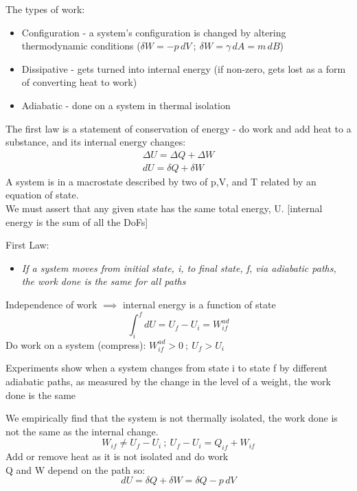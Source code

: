 \documentclass[a4paper, 11pt, normalem]{report}
\begin{document}
The types of work:
\begin{itemize}
    \item Configuration - a system's configuration is changed by altering thermodynamic conditions ($\delta W = -p\,dV ~;~ \delta W = \gamma\,dA = m\,dB$)
    \item Dissipative - gets turned into internal energy (if non-zero, gets lost as a form of converting heat to work)
    \item Adiabatic - done on a system in thermal isolation
\end{itemize}

The first law is a statement of conservation of energy - do work and add heat to a substance, and its internal energy changes:
\begin{gather*}
    \Delta U = \Delta Q + \Delta W \\
    dU = \delta Q + \delta W
\end{gather*}
A system is in a macrostate described by two of p,V, and T related by an equation of state. \\
We must assert that any given state has the same total energy, U. [internal energy is the sum of all the DoFs]

First Law:
\begin{itemize}
    \item \emph{If a system moves from initial state, i, to final state, f, via adiabatic paths, the work done is the same for all paths}
\end{itemize}
Independence of work $\implies$ internal energy is a function of state
\begin{equation*}
    \int_{i}^{f} dU = U_f - U_i = W_{if}^{ad}
\end{equation*}
Do work on a system (compress): $W_{if}^{ad} > 0 ~;~ U_f > U_i$

Experiments show when a system changes from state i to state f by different adiabatic paths, as measured by the change in the level of a weight, the work done is the same

We empirically find that the system is not thermally isolated, the work done is not the same as the internal change.
\begin{equation*}
    W_{if} \neq U_f - U_i ~;~ U_f - U_i = Q_{if} + W_{if}
\end{equation*}
Add or remove heat as it is not isolated and do work \\
Q and W depend on the path so:
\begin{equation*}
    dU = \delta Q + \delta W = \delta Q - p\,dV
\end{equation*}
\end{document}
